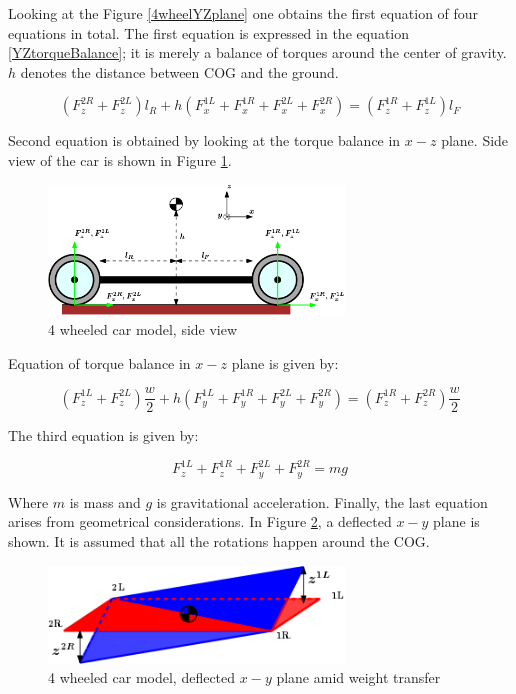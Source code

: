 \documentclass[paper=a4, fontsize=11pt]{scrartcl} %
\numberwithin{equation}{section} %
\numberwithin{figure}{section} %
\numberwithin{table}{section} %
\begin{document}
Looking at the Figure \ref{4wheelYZplane} one obtains the first equation of four equations in total. The first equation is expressed in the equation \ref{YZtorqueBalance}; it is merely a balance of torques around the center of gravity. $h$ denotes the distance between COG and the ground.

\begin{equation}
\left(F^{2R}_z+F^{2L}_z \right)l_R + h\left(F^{1L}_x + F^{1R}_x + F^{2L}_x + F^{2R}_x\right) = \left(F^{1R}_z+F^{1L}_z \right)l_F \label{YZtorqueBalance}
\end{equation}

Second equation is obtained by looking at the torque balance in $x-z$ plane. Side view of the car is shown in Figure \ref{4wheelXZplane}.

\begin{figure}[h!]
	\centering
	\includegraphics[width=0.7\textwidth]{drawings/4wheelXZplane.png}
	\caption{4 wheeled car model, side view}
	\label{4wheelXZplane}
\end{figure}

Equation of torque balance in $x-z$ plane is given by:

\begin{equation}
\left(F^{1L}_z+F^{2L}_z \right)\frac{w}{2} + h\left(F^{1L}_y + F^{1R}_y + F^{2L}_y + F^{2R}_y \right) = \left(F^{1R}_z+F^{2R}_z \right)\frac{w}{2} \label{XZtorqueBalance}
\end{equation} 

The third equation is given by:

\begin{equation}
F^{1L}_z+F^{1R}_z + F^{2L}_y + F^{2R}_y = mg\label{gravityBalance}
\end{equation} 

Where $m$ is mass and $g$ is gravitational acceleration. Finally, the last equation arises from geometrical considerations. In Figure \ref{deflectedPlane}, a deflected $x-y$ plane is shown. It is assumed that all the rotations happen around the COG.

\begin{figure}[h!]
	\centering
	\includegraphics[width=0.7\textwidth]{drawings/deflectedPlane.png}
	\caption{4 wheeled car model, deflected $x-y$ plane amid weight transfer}
	\label{deflectedPlane}
\end{figure}
\end{document}
